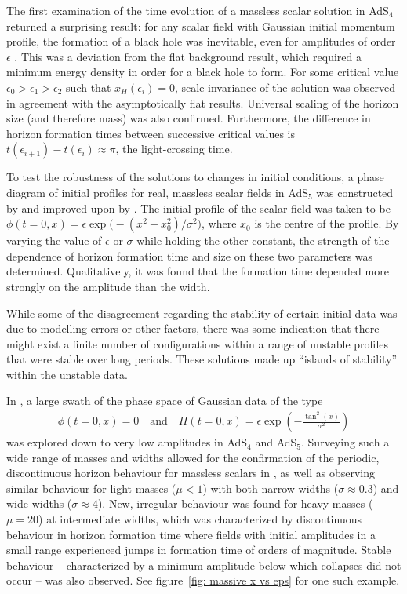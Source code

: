 \documentclass[../PhD.tex]{subfiles}
\begin{document}
The first examination of the time evolution of a massless scalar solution in AdS$_4$ returned a surprising result: for any scalar field with Gaussian initial momentum profile, the formation of a black hole was inevitable, even for amplitudes of order $\epsilon$ \cite{1104.3702}. This was a deviation from the flat background result, which required a minimum energy density in order for a black hole to form. For some critical value $\epsilon_0 > \epsilon_1 > \epsilon_2$ such that $x_H(\epsilon_i) = 0$, scale invariance of the solution was observed in agreement with the asymptotically flat results. Universal scaling of the horizon size (and therefore mass) was also confirmed. Furthermore, the difference in horizon formation times between successive critical values is $t(\epsilon_{i+1}) - t(\epsilon_i) \approx \pi$, the light-crossing time.

To test the robustness of the solutions to changes in initial conditions, a phase diagram of initial profiles for real, massless scalar fields in AdS$_5$ was constructed by \cite{1106.2339} and improved upon by \cite{1110.5823}. The initial profile of the scalar field was taken to be $\phi(t=0, x) = \epsilon \exp \big( -(x^2 - x_0^2) / \sigma^2 \big)$, where $x_0$ is the centre of the profile. By varying the value of $\epsilon$ or $\sigma$ while holding the other constant, the strength of the dependence of horizon formation time and size on these two parameters was determined. Qualitatively, it was found that the formation time depended more strongly on the amplitude than the width. 

While some of the disagreement regarding the stability of certain initial data was due to modelling errors or other factors, there was some indication that there might exist a finite number of configurations within a range of unstable profiles that were stable over long periods. These solutions made up ``islands of stability'' within the unstable data.
 
In \cite{1508.02709}, a large swath of the phase space of Gaussian data of the type
\begin{align}
\label{scalar ics}
\phi(t=0,x) = 0 \quad \text{and} \quad \Pi (t=0,x) = \epsilon \exp \left( - \frac{\tan^2 (x)}{\sigma^2} \right)
\end{align}
was explored down to very low amplitudes in AdS$_4$ and AdS$_5$. Surveying such a wide range of masses and widths allowed for the confirmation of the periodic, discontinuous horizon behaviour for massless scalars in \cite{1104.3702}, as well as observing similar behaviour for light masses ($\mu < 1$) with both narrow widths ($\sigma \approx 0.3$) and wide widths ($\sigma \approx 4$). New, irregular behaviour was found for heavy masses ($\mu = 20$) at intermediate widths, which was characterized by discontinuous behaviour in horizon formation time where fields with initial amplitudes in a small range experienced jumps in formation time of orders of magnitude. Stable behaviour -- characterized by a minimum amplitude below which collapses did not occur -- was also observed. See figure~\ref{fig: massive x vs eps} for one such example.
\end{document}
